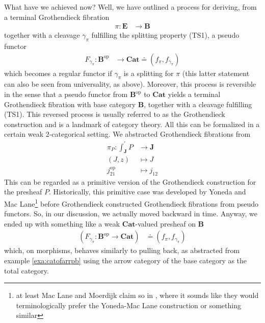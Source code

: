 What have we achieved now? Well, we have outlined a process for deriving, from a terminal Grothendieck fibration
\begin{align*}
  \pi
  \colon
  \mathbf{E}
  &\rightarrow
  \mathbf{B}
\end{align*}
together with a cleavage $\gamma_{\pi}$ fulfilling the splitting property (TS1), a pseudo functor
\begin{align*}
  F_{\gamma_{\pi}}
  \colon
  \mathbf{B}^{\mathrm{op}}
  &\rightarrow
  \mathbf{Cat}
  \doteq
  \left(
    f_{\pi},
    f_{\gamma_{\pi}}
  \right)
\end{align*}
which becomes a regular functor if $\gamma_{\pi}$ is a splitting for $\pi$ (this latter statement can also be seen from universality, as above).
Moreover, this process is reversible in the sense that a pseudo functor from $\mathbf{B}^{\mathrm{op}}$ to $\mathbf{Cat}$ yields a terminal Grothendieck fibration with base category $\mathbf{B}$, together with a cleavage fulfilling (TS1).
This reversed process is usually referred to as the {\glqq}Grothendieck construction{\grqq} and is a landmark of category theory.
All this can be formalized in a certain weak $2$-categorical setting.
We abstracted Grothendieck fibrations from
\begin{align*}
  \pi_{P}
  \colon
  \int_{\mathbf{J}}^{\prime}
  P
  &\rightarrow
  \mathbf{J}
  \\
  (J,z)
  &\mapsto
  J
  \\
  j_{21}^{\mathrm{op}}
  &\mapsto
  j_{12}
\end{align*}
This can be regarded as a primitive version of the Grothendieck construction for the presheaf $P$.
Historically, this primitive case was developed by Yoneda and Mac Lane\footnote{at least Mac Lane and Moerdijk claim so in \cite{c55c71e8}, where it sounds like they would terminologically prefer the Yoneda-Mac Lane construction or something similar} before Grothendieck constructed Grothendieck fibrations from pseudo functors.
So, in our discussion, we actually moved backward in time.
Anyway, we ended up with something like a weak $\mathbf{Cat}$-valued presheaf on $\mathbf{B}$
\begin{align*}
  \left(
    F_{\gamma_{\pi}}
    \colon
    \mathbf{B}^{\mathrm{op}}
    \rightarrow
    \mathbf{Cat}
  \right)
  &\doteq
  \left(
    f_{\pi},
    f_{\gamma_{\pi}}
  \right)
\end{align*}
which, on morphisms, behaves similarly to pulling back, as abstracted from example \ref{exa:catofarrpb} using the arrow category of the base category as the total category.
